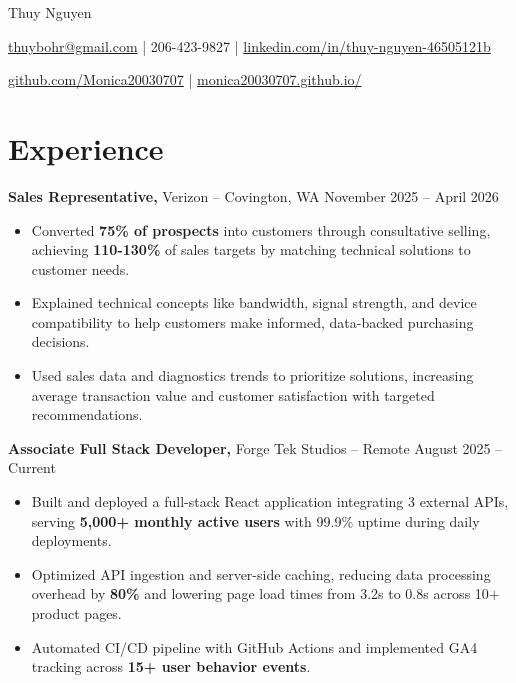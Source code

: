 \documentclass[11pt]{article}
\begin{document}
\centerline{\Huge Thuy Nguyen}

\vspace{5pt}

\centerline{\href{mailto:thuybohr@gmail.com}{thuybohr@gmail.com} | 206-423-9827 |
\href{https://www.linkedin.com/in/thuy-nguyen-46505121b/}{linkedin.com/in/thuy-nguyen-46505121b}}

\centerline{\href{https://github.com/Monica20030707}{github.com/Monica20030707} |
\href{https://monica20030707.github.io/}{monica20030707.github.io/}}

\vspace{-9pt}

\section*{Experience}

\textbf{Sales Representative,} {Verizon} -- Covington, WA \hfill November 2025 -- April 2026 \\
\vspace{-9pt}
\begin{itemize}
  \item Converted \textbf{75\% of prospects} into customers through consultative selling, achieving \textbf{110-130\%} of sales targets by matching technical solutions to customer needs.
  \item Explained technical concepts like bandwidth, signal strength, and device compatibility to help customers make informed, data-backed purchasing decisions.
  \item Used sales data and diagnostics trends to prioritize solutions, increasing average transaction value and customer satisfaction with targeted recommendations.
\end{itemize}

\textbf{Associate Full Stack Developer,} {Forge Tek Studios} -- Remote \hfill August 2025 -- Current
\vspace{-9pt}
\begin{itemize}
  \item Built and deployed a full-stack React application integrating 3 external APIs, serving \textbf{5,000+ monthly active users} with 99.9\% uptime during daily deployments.
  \item Optimized API ingestion and server-side caching, reducing data processing overhead by \textbf{80\%} and lowering page load times from 3.2s to 0.8s across 10+ product pages.
  \item Automated CI/CD pipeline with GitHub Actions and implemented GA4 tracking across \textbf{15+ user behavior events}.
\end{itemize}
\end{document}
